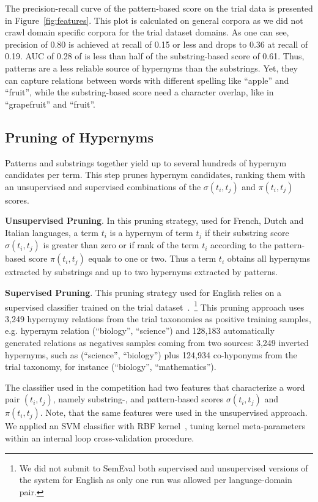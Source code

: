 \documentclass[11pt,letterpaper]{article}
\begin{document}
The precision-recall curve of the pattern-based score on the trial data is presented in Figure~\ref{fig:features}. This plot is calculated on general corpora as we did not crawl domain specific corpora for the trial dataset domains. As one can see, precision of 0.80 is achieved at recall of 0.15 or less and drops to 0.36 at recall of 0.19. AUC of 0.28 of is less than half of the substring-based score of 0.61. Thus, patterns are  a less reliable source of hypernyms than the substrings. Yet, they can capture relations between words with different spelling like ``apple'' and ``fruit'', while the substring-based score need a character overlap, like in ``grapefruit'' and ``fruit''.   

\subsection{Pruning of Hypernyms}
\label{sec:step4}
Patterns and substrings together yield up to several hundreds of hypernym candidates per term. This step prunes hypernym candidates, ranking them with an unsupervised and supervised combinations of the $\sigma(t_i,t_j)$ and $\pi(t_i,t_j)$ scores. 

\textbf{Unsupervised Pruning}. In this pruning strategy, used for French, Dutch and Italian languages, a term $t_i$ is a hypernym of term $t_j$ if their substring score $\sigma(t_i,t_j)$ is greater than zero or if rank of the term $t_i$ according to the pattern-based score $\pi(t_i,t_j)$ equals to one or two. Thus a term $t_i$ obtains all hypernyms extracted by substrings and up to two hypernyms extracted by patterns.   

\textbf{Supervised Pruning}. This pruning strategy used for English relies on a supervised classifier trained on the trial  dataset~\cite{task13semeval2016}.~\footnote{We did not submit to SemEval both supervised and unsupervised versions of the system for English as only one run was allowed per language-domain pair.} This pruning approach uses 3,249 hypernymy relations from the trial taxonomies as positive training samples, e.g. hypernym relation  (``biology'', ``science'') and 128,183 automatically generated relations as negatives samples coming from two sources:  3,249 inverted hypernyms, such as (``science'', ``biology'') plus 124,934 co-hyponyms from the trial taxonomy, for instance (``biology'', ``mathematics''). 

The classifier used in the competition had two features that characterize a word pair $(t_i,t_j)$, namely substring-, and pattern-based scores $\sigma(t_i,t_j)$ and $\pi(t_i,t_j)$. Note, that the same features were used in the unsupervised approach. We applied an SVM classifier with RBF kernel~\cite{vert2004primer}, tuning kernel meta-parameters within an internal loop cross-validation procedure.  
\end{document}
